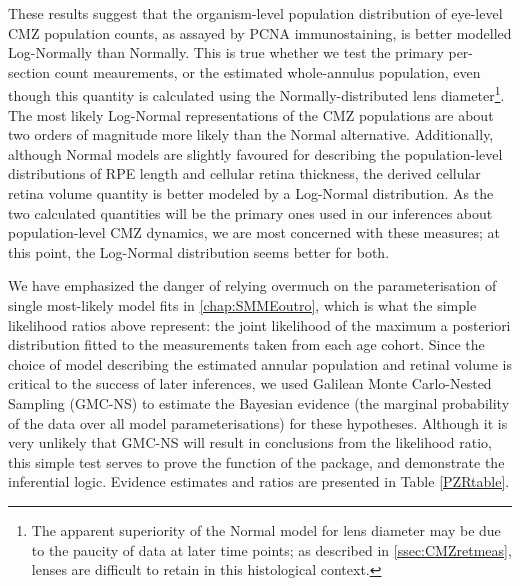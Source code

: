 These results suggest that the organism-level population distribution of eye-level CMZ population counts, as assayed by PCNA immunostaining, is better modelled Log-Normally than Normally. This is true whether we test the primary per-section count meaurements, or the estimated whole-annulus population, even though this quantity is calculated using the Normally-distributed lens diameter\footnote{The apparent superiority of the Normal model for lens diameter may be due to the paucity of data at later time points; as described in \autoref{ssec:CMZretmeas}, lenses are difficult to retain in this histological context.}. The most likely Log-Normal representations of the CMZ populations are about two orders of magnitude more likely than the Normal alternative. Additionally, although Normal models are slightly favoured for describing the population-level distributions of RPE length and cellular retina thickness, the derived cellular retina volume quantity is better modeled by a Log-Normal distribution. As the two calculated quantities will be the primary ones used in our inferences about population-level CMZ dynamics, we are most concerned with these measures; at this point, the Log-Normal distribution seems better for both.

We have emphasized the danger of relying overmuch on the parameterisation of single most-likely model fits in \autoref{chap:SMMEoutro}, which is what the simple likelihood ratios above represent: the joint likelihood of the maximum a posteriori distribution fitted to the measurements taken from each age cohort. Since the choice of model describing the estimated annular population and retinal volume is critical to the success of later inferences, we used Galilean Monte Carlo-Nested Sampling (GMC-NS) to estimate the Bayesian evidence (the marginal probability of the data over all model parameterisations) for these hypotheses. Although it is very unlikely that GMC-NS will result in conclusions from the likelihood ratio, this simple test serves to prove the function of the  package, and demonstrate the inferential logic. Evidence estimates and ratios are presented in Table \ref{PZRtable}.


